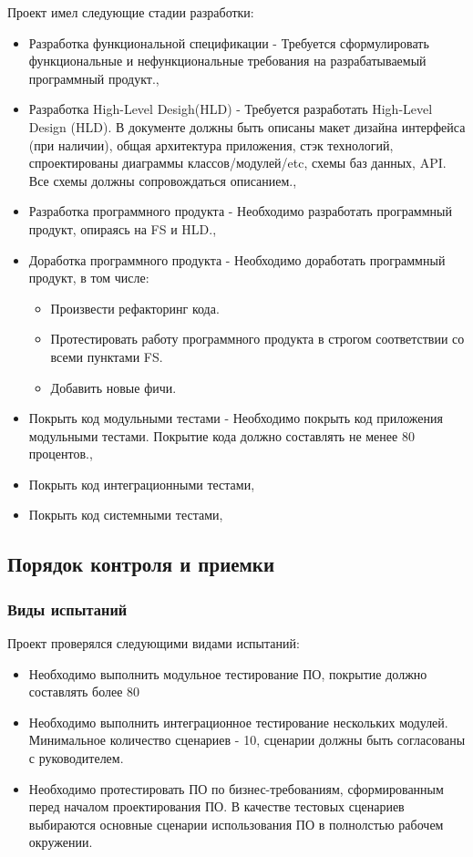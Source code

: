 \documentclass[a4paper, 14pt]{article}
\begin{document}
\noindent Проект имел следующие стадии разработки:
\begin{itemize}
    \item Разработка функциональной спецификации - Требуется сформулировать функциональные и нефункциональные требования на разрабатываемый программный продукт.,
    \item Разработка High-Level Desigh(HLD) - Требуется разработать High-Level Design (HLD). В документе должны быть описаны макет дизайна интерфейса (при наличии), общая архитектура приложения, стэк технологий, спроектированы диаграммы классов/модулей/etc, схемы баз данных, API. Все схемы должны сопровождаться описанием.,
    \item Разработка программного продукта - Необходимо разработать программный продукт, опираясь на FS и HLD.,
    \item Доработка программного продукта - Необходимо доработать программный продукт, в том числе: 
    \begin{itemize}\item Произвести рефакторинг кода. \item Протестировать работу программного продукта в строгом соответствии со всеми пунктами FS. \item Добавить новые фичи.\end{itemize}
    \item Покрыть код модульными тестами - Необходимо покрыть код приложения модульными тестами. Покрытие кода должно составлять не менее 80 процентов.,
    \item Покрыть код интеграционными тестами,
    \item Покрыть код системными тестами,
\end{itemize}

\subsection{Порядок контроля и приемки}

\subsubsection{Виды испытаний}

Проект проверялся следующими видами испытаний:
\begin{itemize}
    \item Необходимо выполнить модульное тестирование ПО, покрытие должно составлять более 80%
    \item Необходимо выполнить интеграционное тестирование нескольких модулей. Минимальное количество сценариев - 10, сценарии должны быть согласованы с руководителем.
    \item Необходимо протестировать ПО по бизнес-требованиям, сформированным перед началом проектирования ПО. В качестве тестовых сценариев выбираются основные сценарии использования ПО в полнолстью рабочем окружении.
\end{itemize}
\end{document}
